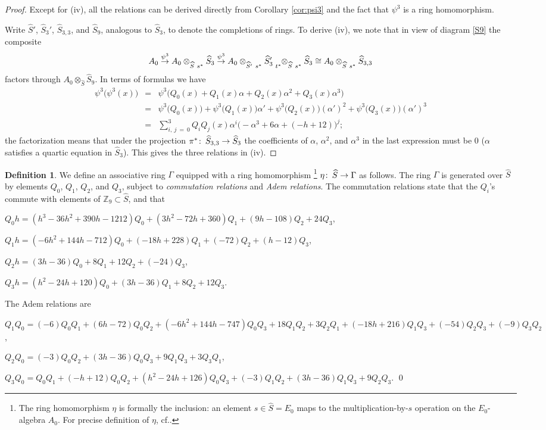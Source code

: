 \documentclass{gtpart}
\theoremstyle{definition}
\newtheorem{defn}[thm]{Definition}
\theoremstyle{remark}
\def\co{\colon\thinspace}
\newcommand{\mb}[1]{\mathbb{#1}}
\newcommand{\cff}[2]{cf.\thinspace{\cite[#1]{#2}}}
\newcommand{\BZ}{{\mb Z}}
\newcommand{\HS}{\widehat{S}}
\newcommand{\A}{\alpha}
\newcommand{\p}{\psi^3}
\newcommand{\G}{\Gamma}
\begin{document}
\begin{proof}
 Except for (iv), all the relations can be derived directly from Corollary \ref{cor:psi3} and the fact that $\p$ is a ring homomorphism.  

 Write $\HS'$, $\HS_3'$, $\HS_{3,3}$, and $\HS_9$, analogous to $\HS_3$, to denote the completions of rings.  
 To derive (iv), we note that in view of diagram \eqref{S9} the composite 
 \[
  A_0 \stackrel{\p}{\to} A_0 \tensor[]{\otimes}{_{\HS}_{~s^*}} \HS_3 
  \stackrel{\p}{\to} A_0 \tensor[]{\otimes}{_{\HS'}_{~s^*}} \HS_3' \tensor[_{t^*}]{\otimes}{_{\HS}_{~s^*}} \HS_3 
  \cong A_0 \tensor[]{\otimes}{_{\HS}_{~s^*}} \HS_{3,3} 
 \]
 factors through $A_0 \otimes_{\HS} \HS_9$.  In terms of formulas we have 
 \begin{eqnarray*}
  \p \big( \p(x) \big) & = & \p \big( Q_0(x) + Q_1(x) \A + Q_2(x) \A^2 + Q_3(x) \A^3 \big) \\
                       & = & \p \big( Q_0(x) \big) + \p \big( Q_1(x) \big) \A' + \p \big( Q_2(x) \big) (\A')^2 + \p \big( Q_3(x) \big) (\A')^3 \\
                       & = & \sum_{i,~j~=~0}^3 Q_iQ_j(x) \A^i \big( -\A^3 + 6 \A + (-h + 12) \big)^j; 
 \end{eqnarray*}
 the factorization means that under the projection $\pi^* \co \HS_{3,3} \to \HS_3$ the coefficients of $\A$, $\A^2$, and $\A^3$ in the last expression must be 0 
 ($\A$ satisfies a quartic equation in $\HS_3$).  This gives the three relations in (iv).
\end{proof}

\begin{defn}
\label{def}
 We define an associative ring $\G$ equipped with a ring homomorphism 
 \footnote{The ring homomorphism $\eta$ is formally the inclusion: an element $s \in \HS = E_0$ maps to the multiplication-by-$s$ operation on the $E_0$-algebra $A_0$.  
 For precise definition of $\eta$, \cff{Section 6}{cong}.  } $\eta \co \HS \to \G$ as follows.  
 The ring $\G$ is generated over $\HS$ by elements $Q_0$, $Q_1$, $Q_2$, and $Q_3$, subject to {\em commutation relations} and {\em Adem relations}.  
 The commutation relations state that the $Q_i$'s commute with elements of $\BZ_9 \subset \HS$, and that 

 $Q_0 h = (h^3 - 36 h^2 + 390 h - 1212) Q_0 + (3 h^2 - 72 h + 360) Q_1 + (9 h - 108) Q_2 + 24 Q_3$, 

 $Q_1 h = (-6 h^2 + 144 h - 712) Q_0 + (-18 h + 228) Q_1 + (-72) Q_2 + (h - 12) Q_3$, 

 $Q_2 h = (3 h - 36) Q_0 + 8 Q_1 + 12 Q_2 + (-24) Q_3$, 

 $Q_3 h = (h^2 - 24 h + 120) Q_0 + (3 h - 36) Q_1 + 8 Q_2 + 12 Q_3$.  

 The Adem relations are 

 $Q_1Q_0 = (-6) Q_0Q_1 + (6 h - 72) Q_0Q_2 + (-6 h^2 + 144 h - 747) Q_0Q_3 + 18 Q_1Q_2 + 3 Q_2Q_1 + (-18 h + 216) Q_1Q_3 + (-54) Q_2Q_3 + (-9) Q_3Q_2$, 

 $Q_2Q_0 = (-3) Q_0Q_2 + (3 h - 36) Q_0Q_3 + 9 Q_1Q_3 + 3 Q_3Q_1$, 

 $Q_3Q_0 = Q_0Q_1 + (-h + 12) Q_0Q_2 + (h^2 - 24 h + 126) Q_0Q_3 + (-3) Q_1Q_2 + (3 h - 36) Q_1Q_3 + 9 Q_2Q_3$.  
\qed
\end{defn}
\end{document}
